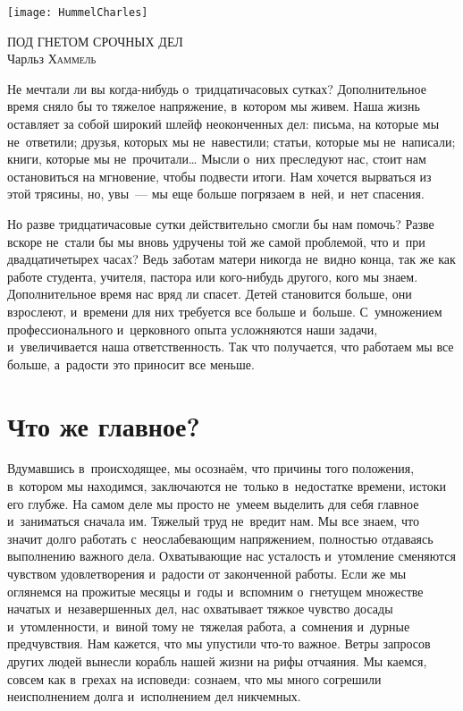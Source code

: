 \documentclass[12pt,article,a4paper,fittopage]{ncc}
\begin{document}
\begin{center}
\texttt{[image: HummelCharles]}

\thispagestyle{empty}

\vspace{0.5cm}
\textsc{\LARGE{ПОД ГНЕТОМ СРОЧНЫХ ДЕЛ}}\\[0.3cm]
Чарльз \textsc{Хаммель}
\end{center}

\setcounter{page}{1}
\begin{multicols}{2}
Не мечтали ли вы когда-нибудь о~тридцатичасовых сутках? Дополнительное время сняло бы то тяжелое напряжение, в~котором мы живем. Наша жизнь оставляет за собой широкий шлейф неоконченных дел: письма, на которые мы не~ответили; друзья, которых мы не~навестили; статьи, которые мы не~написали; книги, которые мы не~прочитали\ldots{} Мысли о~них преследуют нас, стоит нам остановиться на мгновение, чтобы подвести итоги. Нам хочется вырваться из этой трясины, но, увы~--- мы еще больше погрязаем в~ней, и~нет спасения. 

Но разве тридцатичасовые сутки действительно смогли бы нам помочь? Разве вскоре не~стали бы мы вновь удручены той же самой проблемой, что и~при двадцатичетырех часах? Ведь заботам матери никогда не~видно конца, так же как работе студента, учителя, пастора или кого-нибудь другого, кого мы знаем. Дополнительное время нас вряд ли спасет. Детей становится больше, они взрослеют, и~времени для них требуется все больше и~больше. С~умножением профессионального и~церковного опыта усложняются наши задачи, и~увеличивается наша ответственность. Так что получается, что работаем мы все больше, а~радости это приносит все меньше.

\section*{Что же главное?}

Вдумавшись в~происходящее, мы осознаём, что причины того положения, в~котором мы находимся, заключаются не~только в~недостатке времени, истоки его глубже. На самом деле мы просто не~умеем выделить для себя главное и~заниматься сначала им. Тяжелый труд не~вредит нам. Мы все знаем, что значит долго работать с~неослабевающим напряжением, полностью отдаваясь выполнению важного дела. Охватывающие нас усталость и~утомление сменяются чувством удовлетворения и~радости от законченной работы. Если же мы оглянемся на прожитые месяцы и~годы и~вспомним о~гнетущем множестве начатых и~незавершенных дел, нас охватывает тяжкое чувство досады и~утомленности, и~виной тому не~тяжелая работа, а~сомнения и~дурные предчувствия. Нам кажется, что мы упустили что-то важное. Ветры запросов других людей вынесли корабль нашей жизни на рифы отчаяния. Мы каемся, совсем как в~грехах на исповеди: сознаем, что мы много согрешили неисполнением долга и~исполнением дел никчемных. 


\end{multicols}
\end{document}
